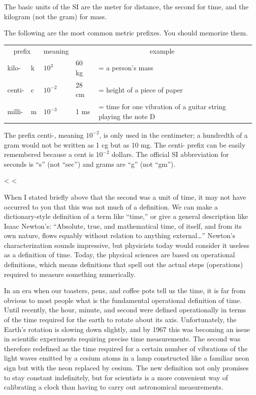 The basic units of the SI are the meter for
distance, the second for time, and the kilogram (not the gram) for mass.

The following are the most common metric prefixes. You
should memorize them.

\begin{tabular}{llllp{60mm}}
    \multicolumn{2}{c}{prefix} & meaning & \multicolumn{2}{c}{example} \\
    kilo-  &   k   & $10^3$     &   60 kg     & =  a person's mass  \\
    centi- &   c   & $10^{-2}$  &   28 cm     & =  height of a piece of paper  \\
    milli- &   m   & $10^{-3}$  &   1 ms     & =  time for one vibration of a guitar string playing the note D
\end{tabular}


The prefix centi-, meaning $10^{-2}$, is only used in the
centimeter; a hundredth of a gram would not be written as 1
cg but as 10 mg. The centi- prefix can be easily remembered
because a cent is $10^{-2}$  dollars. The official SI
abbreviation for seconds is ``s'' (not ``sec'') and grams
are ``g'' (not ``gm'').

<%
<%

When I stated briefly above that the second was a unit of
time, it may not have occurred to you that this was not
much of a definition. We can make a dictionary-style
definition of a term like ``time,'' or give a general description
like Isaac Newton's: ``Absolute, true, and mathematical time, of itself, and from
its own nature, flows equably without relation to anything external\ldots''
Newton's characterization sounds impressive, but 
physicists today would consider it useless as a definition
of time. Today, the physical sciences are based on
\label{operational-definitions}operational definitions,
which means definitions that spell out the actual steps
(operations) required to measure something numerically.

In an era when our toasters, pens, and coffee pots tell
us the time, it is far from obvious to most people what is
the fundamental operational definition of time. Until
recently, the hour, minute, and second were defined
operationally in terms of the time required for the earth to
rotate about its axis. Unfortunately, the Earth's rotation
is slowing down slightly, and by 1967 this was becoming an
issue in scientific experiments requiring precise time
measurements. The second was therefore
redefined as the time required for a certain number of
vibrations of the light waves emitted by a cesium atoms in a
lamp constructed like a familiar neon sign but with the neon
replaced by cesium. The new definition not only promises to
stay constant indefinitely, but for scientists is a more
convenient way of calibrating a clock than having to carry
out astronomical measurements.

